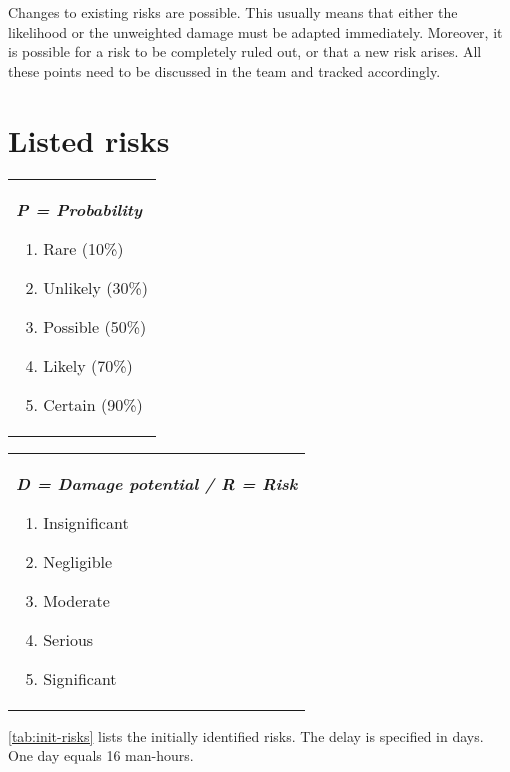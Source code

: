 Changes to existing risks are possible. This usually means that either the likelihood or
the unweighted damage must be adapted immediately. Moreover, it is possible for a risk to
be completely ruled out, or that a new risk arises. All these points need to be discussed in
the team and tracked accordingly.

\section{Listed risks}
\begin{tabular}[t]{@{}>{\raggedright}p{}}
  \textbf{\textit{P = Probability}}
  \begin{enumerate}[topsep=0pt,itemsep=-2pt,leftmargin=13pt]
  \item Rare (10\%)
  \item Unlikely (30\%)
  \item Possible (50\%)
  \item Likely (70\%)
  \item Certain (90\%)
  \end{enumerate}
\end{tabular}
\begin{tabular}[t]{@{}>{\raggedright}p{}@{}}
  \textbf{\textit{D = Damage potential  / R = Risk}}
  \begin{enumerate}[topsep=0pt,itemsep=-2pt,leftmargin=13pt]
  \item Insignificant
  \item Negligible
  \item Moderate
  \item Serious
  \item Significant
  \end{enumerate}
\end{tabular}

\autoref{tab:init-risks} lists the initially identified risks. The delay is
specified in days. One day equals 16 man-hours.

